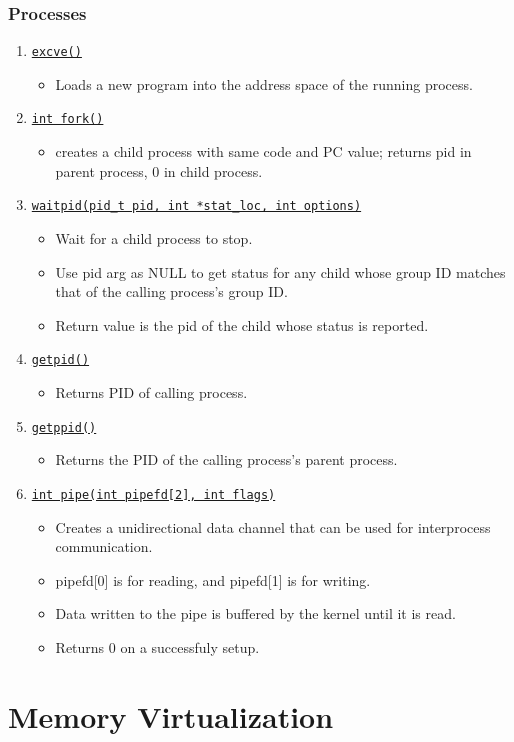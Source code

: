 \documentclass[10pt]{report}
\newcommand{\syscalldoc}[3]{
    \item \href{#2}{\texttt{#1}}
    \begin{itemize}
        #3
    \end{itemize}
}
\begin{document}
\subsection{Processes}
\begin{enumerate}
\syscalldoc{excve()}{...}{
\item Loads a new program into the address space of the running process.
}
\syscalldoc{int fork()}
{https://man7.org/linux/man-pages/man2/fork.2.html}{
\item creates a child process with same code and PC value; returns pid in parent process, 0 in child process.
}
\syscalldoc{waitpid(pid\_t pid, int *stat\_loc, int options)}
{https://man7.org/linux/man-pages/man3/waitpid.3p.html}{
\item Wait for a child process to stop.
\item Use pid arg as NULL to get status for any child whose group ID matches that of the calling process's group ID.
\item Return value is the pid of the child whose status is reported.
}
\syscalldoc{getpid()}{...}{
\item Returns PID of calling process.
}
\syscalldoc{getppid()}{...}{
\item Returns the PID of the calling process's parent process.
}
\syscalldoc{int pipe(int pipefd[2], int flags)}
{https://man7.org/linux/man-pages/man2/pipe.2.html}{
\item Creates a unidirectional data channel that can be used for interprocess communication.
\item pipefd[0] is for reading, and pipefd[1] is for writing.
\item Data written to the pipe is buffered by the kernel until it is read.
\item Returns 0 on a successfuly setup.
}
\end{enumerate}
\chapter{Memory Virtualization}
\end{document}
